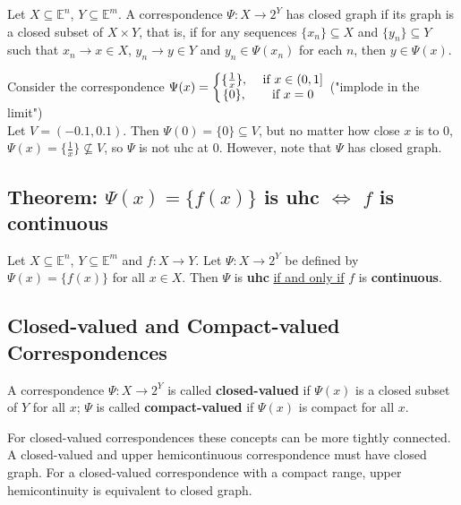 \documentclass[11pt]{elegantbook}
\begin{document}
\begin{definition}
    \normalfont
    Let $X\subseteq \mathbb{E}^n$, $Y\subseteq \mathbb{E}^m$. A correspondence $\Psi: X \rightarrow 2^Y$ has closed graph if its graph is a closed subset of $X \times Y$, that is, if for any sequences $\{x_n\} \subseteq X$ and $\{y_n\} \subseteq Y$ such that $x_n \rightarrow x \in X$, $y_n \rightarrow y \in Y$ and $y_n \in \Psi(x_n)$ for each $n$, then $y \in \Psi(x)$.
\end{definition}
\begin{example}
    Consider the correspondence $\Psi(x)=\left\{\begin{matrix}
        \{\frac{1}{x}\},&\textnormal{ if }x\in(0,1]\\
        \{0\},&\textnormal{ if }x=0
    \end{matrix}\right.$ ("implode in the limit")\\
    Let $V = (-0.1, 0.1)$. Then $\Psi(0) = \{0\} \subseteq V$, but no matter how close $x$ is to $0$, $\Psi(x)=\{\frac{1}{x}\}\nsubseteq V$, so $\Psi$ is not uhc at $0$. However, note that $\Psi$ has closed graph.
\end{example}

\subsection{Theorem: $\Psi(x)=\{f(x)\}$ is uhc $\Leftrightarrow$ $f$ is continuous}
\begin{theorem}[$\Psi(x)=\{f(x)\}$ is uhc $\Leftrightarrow$ $f$ is continuous]
    Let $X \subseteq \mathbb{E}^n$, $Y \subseteq \mathbb{E}^m$ and $f : X \rightarrow Y$. Let $\Psi : X \rightarrow  2^Y$ be defined by $\Psi(x) = \{f(x)\}$ for all $x \in X$. Then $\Psi$ is \textbf{uhc} \underline{if and only if} $f$ is \textbf{continuous}.
\end{theorem}

\subsection{Closed-valued and Compact-valued Correspondences}
\begin{definition}
    \normalfont
    A correspondence $\Psi : X \rightarrow 2^Y$ is called \textbf{closed-valued} if $\Psi(x)$ is a closed subset of $Y$ for all $x$; $\Psi$ is called \textbf{compact-valued} if $\Psi(x)$ is compact for all $x$.
\end{definition}
For closed-valued correspondences these concepts can be more tightly connected. A closed-valued and upper hemicontinuous correspondence must have closed graph. For a closed-valued correspondence with a compact range, upper hemicontinuity is equivalent to closed graph.
\end{document}
